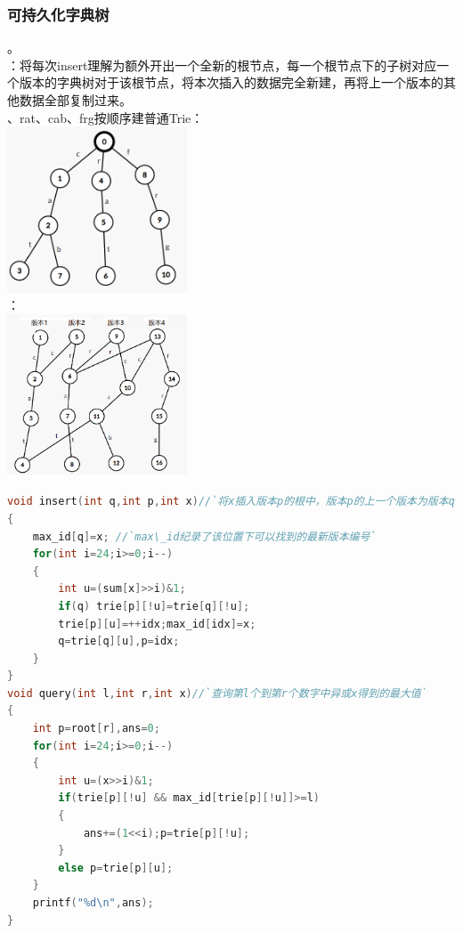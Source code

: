 \documentclass[a4paper]{book}
\begin{document}
\subsubsection{可持久化字典树}
。\\
：将每次insert理解为额外开出一个全新的根节点，每一个根节点下的子树对应一个版本的字典树对于该根节点，将本次插入的数据完全新建，再将上一个版本的其他数据全部复制过来。\\
、rat、cab、frg按顺序建普通Trie：\\
\includegraphics[width=0.4\textwidth,center]{../photo/trie1.png}\\
：\\
\includegraphics[width=0.4\textwidth,center]{../photo/trie2.png}\\
\begin{lstlisting}[language=c++,escapeinside=``]
void insert(int q,int p,int x)//`将x插入版本p的根中，版本p的上一个版本为版本q`
{
    max_id[q]=x; //`max\_id纪录了该位置下可以找到的最新版本编号`
    for(int i=24;i>=0;i--)
    {
        int u=(sum[x]>>i)&1;
        if(q) trie[p][!u]=trie[q][!u];
        trie[p][u]=++idx;max_id[idx]=x;
        q=trie[q][u],p=idx;
    }
}
void query(int l,int r,int x)//`查询第l个到第r个数字中异或x得到的最大值`
{
    int p=root[r],ans=0;
    for(int i=24;i>=0;i--)
    {
        int u=(x>>i)&1;
        if(trie[p][!u] && max_id[trie[p][!u]]>=l)
        {
            ans+=(1<<i);p=trie[p][!u];
        }
        else p=trie[p][u];
    }
    printf("%d\n",ans);
}
\end{lstlisting}
\end{document}
